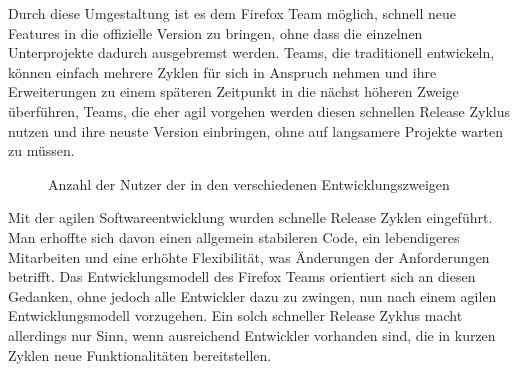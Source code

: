 Durch diese Umgestaltung ist es dem Firefox Team möglich, schnell neue Features in die offizielle Version zu bringen, ohne dass die einzelnen Unterprojekte dadurch ausgebremst werden. Teams, die traditionell entwickeln, können einfach mehrere Zyklen für sich in Anspruch nehmen und ihre Erweiterungen zu einem späteren Zeitpunkt in die nächst höheren Zweige überführen, Teams, die eher agil vorgehen werden diesen schnellen Release Zyklus nutzen und ihre neuste Version einbringen, ohne auf langsamere Projekte warten zu müssen.

\begin{figure}[h]
	\centering
	\caption{Anzahl der Nutzer der in den verschiedenen Entwicklungszweigen\cite{bib:fire-development}}
	\label{fireusers}
\end{figure}

Mit der agilen Softwareentwicklung wurden schnelle Release Zyklen eingeführt. Man erhoffte sich davon einen allgemein stabileren Code, ein lebendigeres Mitarbeiten und eine erhöhte Flexibilität, was Änderungen der Anforderungen betrifft. Das Entwicklungsmodell des Firefox Teams orientiert sich an diesen Gedanken, ohne jedoch alle Entwickler dazu zu zwingen, nun nach einem agilen Entwicklungsmodell vorzugehen. Ein solch schneller Release Zyklus macht allerdings nur Sinn, wenn ausreichend Entwickler vorhanden sind, die in kurzen Zyklen neue Funktionalitäten bereitstellen.

